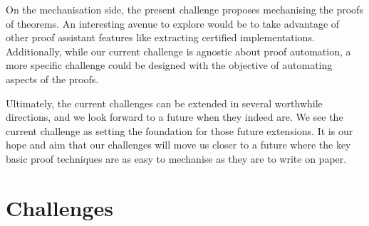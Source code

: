 \documentclass[runningheads]{llncs}
\begin{document}
On the mechanisation side, the present challenge proposes mechanising the proofs of theorems.
An interesting avenue to explore would be to take advantage of other proof assistant features like extracting certified implementations.
Additionally, while our current challenge is agnostic about proof automation, a more specific challenge could be designed with the objective of automating aspects of the proofs.

Ultimately, the current challenges can be extended in several worthwhile directions, and we look forward to a future when they indeed are.
We see the current challenge as setting the foundation for those future extensions.
It is our hope and aim that our challenges will move us closer to a future where the key basic proof techniques are as easy to mechanise as they are to write on paper.




\clearpage
\appendix
\section{Challenges}\label{app:challenges}

\end{document}
